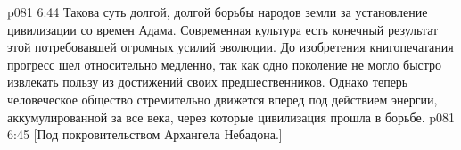 \vs p081 6:44 \pc Такова суть долгой, долгой борьбы народов земли за установление цивилизации со времен Адама. Современная культура есть конечный результат этой потребовавшей огромных усилий эволюции. До изобретения книгопечатания прогресс шел относительно медленно, так как одно поколение не могло быстро извлекать пользу из достижений своих предшественников. Однако теперь человеческое общество стремительно движется вперед под действием энергии, аккумулированной за все века, через которые цивилизация прошла в борьбе.
\vsetoff
\vs p081 6:45 [Под покровительством Архангела Небадона.]

